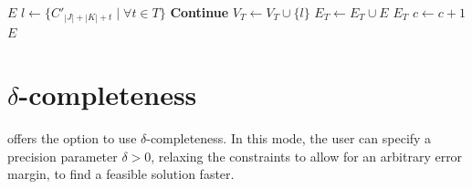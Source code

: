 \documentclass[runningheads]{llncs}
\begin{document}
\begin{algorithm}
\begin{algorithmic}
         
        \State \Return $E$
        \EndIf
        \State $l \gets \{ C'_{|J| + |K| + t} \mid \forall t \in T\}$ %
         
        \State \textbf{Continue}
        \EndIf
        \State $V_T \gets V_T \cup \{l\}$
        \State $E_T \gets E_T \cup E$
         
        \State \Return $E_T$
        \EndIf
        \State $c \gets c + 1$
        \EndWhile
        \State \Return $E$
    \end{algorithmic}
\end{algorithm}

\section{$\delta$-completeness}
\label{sec:delta-completeness}

\dlinear offers the option to use $\delta$-completeness.
In this mode, the user can specify a precision parameter $\delta > 0$, relaxing the constraints to allow for an arbitrary error margin, to find a feasible solution faster.
\end{document}
